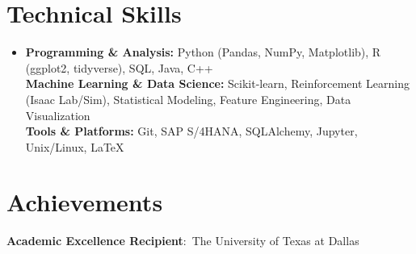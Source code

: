 \documentclass[letterpaper,11pt]{article}
\begin{document}
\section{Technical Skills}
\begin{itemize}[leftmargin=0.15in, label={}]
    \item 
    \small{
        \textbf{Programming \& Analysis:} Python (Pandas, NumPy, Matplotlib), R (ggplot2, tidyverse), SQL, Java, C++ \\
        
        \textbf{Machine Learning \& Data Science:} Scikit-learn, Reinforcement Learning (Isaac Lab/Sim), Statistical Modeling, Feature Engineering, Data Visualization \\
        
        \textbf{Tools \& Platforms:} Git, SAP S/4HANA, SQLAlchemy, Jupyter, Unix/Linux, LaTeX \\
    }
\end{itemize}


\section{Achievements}
 \begin{itemize}[leftmargin=0.15in, label={}]
    \small{\item{
        \textbf{Academic Excellence Recipient}:\ The University of Texas at Dallas \\
    }}
 \end{itemize}
\end{document}
